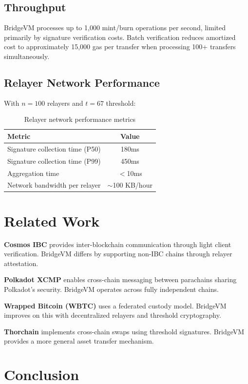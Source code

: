 \documentclass[11pt,a4paper]{article}
\theoremstyle{definition}
\begin{document}
\subsection{Throughput}

BridgeVM processes up to 1,000 mint/burn operations per second, limited primarily by signature verification costs. Batch verification reduces amortized cost to approximately 15,000 gas per transfer when processing 100+ transfers simultaneously.

\subsection{Relayer Network Performance}

With $n = 100$ relayers and $t = 67$ threshold:

\begin{table}[h]
\centering
\begin{tabular}{@{}lc@{}}
\toprule
Metric & Value \\
\midrule
Signature collection time (P50) & 180ms \\
Signature collection time (P99) & 450ms \\
Aggregation time & $<$10ms \\
Network bandwidth per relayer & $\sim$100 KB/hour \\
\bottomrule
\end{tabular}
\caption{Relayer network performance metrics}
\end{table}

\section{Related Work}

\textbf{Cosmos IBC} provides inter-blockchain communication through light client verification. BridgeVM differs by supporting non-IBC chains through relayer attestation.

\textbf{Polkadot XCMP} enables cross-chain messaging between parachains sharing Polkadot's security. BridgeVM operates across fully independent chains.

\textbf{Wrapped Bitcoin (WBTC)} uses a federated custody model. BridgeVM improves on this with decentralized relayers and threshold cryptography.

\textbf{Thorchain} implements cross-chain swaps using threshold signatures. BridgeVM provides a more general asset transfer mechanism.

\section{Conclusion}
\end{document}
